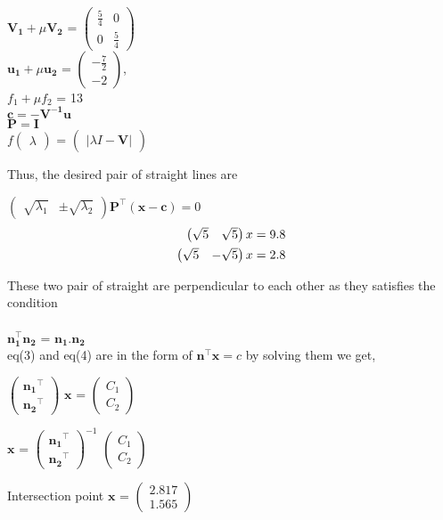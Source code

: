 \documentclass[journal,12pt,twocolumn]{IEEEtran}
\newcommand{\myvec}[1]{\ensuremath{\begin{pmatrix}#1\end{pmatrix}}}
\let\vec\mathbf
\begin{document}
\begin{center}
$\vec{V_1}+\mu\vec{V_2}$ = $\myvec{\frac{5}{4} & 0 \\ 0 & \frac{5}{4}}$ \\ 
\vspace{0.2cm}\hspace*{0.3cm}$\vec{u_1}+\mu\vec{u_2}$ = $\myvec{-\frac{7}{2} \\ -2}$, \\
\vspace{0.2cm}${f_1+\mu f_2}$ = 13 \\ 
\vspace{0.2cm}$\vec{c} = \vec{-V^{-1}u}$ \\
\vspace{0.2cm}$\vec{P} = \vec{I}$ \\
\vspace{0.2cm}$f\myvec{\lambda}$ = $\myvec{|\lambda I - \vec{V}|}$
\end{center} 
Thus, the desired pair of straight lines are 
\begin{center}
$\myvec{\sqrt{\lambda_1} & \pm \sqrt{\lambda_2}}\vec{P}^{\top} \vec{(x-c)}=0$ 
\begin{align}
\myvec{\sqrt{5} & \sqrt{5}}x = 9.8 \\
\vspace{0.5cm}\myvec{\sqrt{5} & -\sqrt{5}}x = 2.8
\end{align}
\end{center}

These two pair of straight are perpendicular to each other as they satisfies the condition \\ \\
\hspace*{2.8cm}$\vec{n_1^{\top} n_2}$ = $\vec{n_1.n_2}$ \\

eq(3) and eq(4) are in the form of $\vec{n^{\top}}\vec{x}=c$ by solving them we get,
\begin{center}
$\myvec{\vec{n_1}^{\top} \\ \vec{n_2}^{\top}}$ $\vec{x}$ = $\myvec{C_1 \\ C_2}$
\end{center} 

\begin{center}
$\vec{x}$ = $\myvec{\vec{n_1}^{\top} \\ \vec{n_2}^{\top}}^{-1}$ $\myvec{C_1 \\ C_2}$
\end{center}

\begin{center}
Intersection point $\vec{x}$ = $\myvec{2.817 \\ 1.565}$
\end{center}
\end{document}
